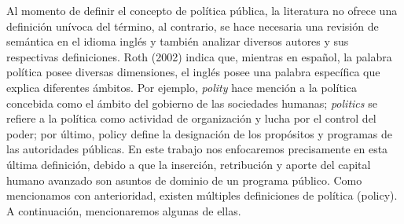 \documentclass{article}
\begin{document}
Al momento de definir el concepto de política pública, la literatura no ofrece una definición unívoca del término, al contrario, se hace necesaria una revisión de semántica en el idioma inglés y también analizar diversos autores y sus respectivas definiciones.
Roth (2002) indica que, mientras en español, la palabra política posee diversas dimensiones, el inglés posee una palabra específica que explica diferentes ámbitos. Por ejemplo, \textit{polity} hace mención a la política concebida como el ámbito del gobierno de las sociedades humanas; \textit{politics} se refiere a la política como actividad de organización y lucha por el control del poder;
por último, policy define la designación de los propósitos y programas de las autoridades
públicas. En este trabajo nos enfocaremos precisamente en esta última definición, debido a que
la inserción, retribución y aporte del capital humano avanzado son asuntos de dominio de un
programa público.
Como mencionamos con anterioridad, existen múltiples definiciones de política (policy). A
continuación, mencionaremos algunas de ellas.
\end{document}
